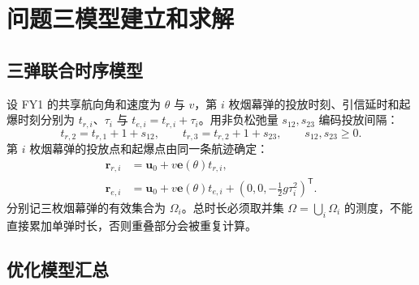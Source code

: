 \section{问题三模型建立和求解}

\subsection{三弹联合时序模型}

设 FY1 的共享航向角和速度为 $\theta$ 与 $v$，第 $i$ 枚烟幕弹的投放时刻、引信延时和起爆时刻分别为 $t_{r,i}$、$\tau_i$ 与 $t_{e,i}=t_{r,i}+\tau_i$。用非负松弛量 $s_{12},s_{23}$ 编码投放间隔：
\begin{equation}
 t_{r,2}=t_{r,1}+1+s_{12},\qquad
 t_{r,3}=t_{r,2}+1+s_{23},\qquad s_{12},s_{23}\ge0.
\end{equation}
第 $i$ 枚烟幕弹的投放点和起爆点由同一条航迹确定：
\begin{align}
 \bm r_{r,i}&=\bm u_0+v\bm e(\theta)t_{r,i},\\
 \bm r_{e,i}&=\bm u_0+v\bm e(\theta)t_{e,i}
 +(0,0,-\tfrac12g\tau_i^2)^{\mathsf T}.
\end{align}
分别记三枚烟幕弹的有效集合为 $\Omega_i$。总时长必须取并集 $\Omega=\bigcup_i\Omega_i$ 的测度，不能直接累加单弹时长，否则重叠部分会被重复计算。

\subsection{优化模型汇总}

